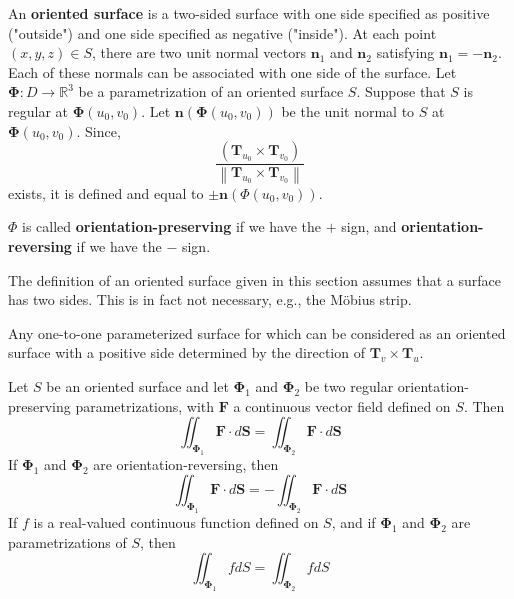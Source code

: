 \noindent An \textbf{oriented surface} is a two-sided surface with one side specified as positive ("outside") and one side specified as negative ("inside"). At each point $(x, y, z) \in S$, there are two unit normal vectors $\mathbf{n}_1$ and $\mathbf{n}_2$ satisfying $\mathbf{n}_1 = -\mathbf{n}_2$. Each of these normals can be associated with one side of the surface. Let $\boldsymbol{\Phi}: D \rightarrow \mathbb{R}^3$ be a parametrization of an oriented surface $S$. Suppose  that $S$ is regular at $\boldsymbol{\Phi}\left(u_0, v_0\right)$. Let $\mathbf{n}\left(\boldsymbol{\Phi}\left(u_0, v_0\right)\right)$ be the unit normal to $S$ at $\mathbf{\Phi}(u_0, v_0)$. Since,
\[\frac{\left(\mathbf{T}_{u_0} \times \mathbf{T}_{v_0}\right) }{\left\|\mathbf{T}_{u_0} \times \mathbf{T}_{v_0}\right\|}\]
\sloppy exists, it is defined and equal to $\pm \mathbf{n}\left(\Phi\left(u_0, v_0\right)\right)$.

\begin{rmk}
	$\Phi$ is called \textbf{orientation-preserving} if we have the $+$ sign, and \textbf{orientation-reversing} if we have the $-$ sign.
\end{rmk}

\begin{marginfigure}
	The definition of an oriented surface given in this section assumes that a surface has two sides. This is in fact not necessary, e.g., the Möbius strip.
\end{marginfigure}

\begin{rmk}
	Any one-to-one parameterized surface for which  can be considered as an oriented surface with a positive side determined by the direction of $\mathbf{T}_v \times \mathbf{T}_u$.
\end{rmk}

\begin{thm}
	Let $S$ be an oriented surface and let $\mathbf{\Phi}_1$ and $\mathbf{\Phi}_2$ be two regular orientation-preserving parametrizations, with $\mathbf{F}$ a continuous vector field defined on $S$. Then
	\[\iint_{\boldsymbol{\Phi}_1} \mathbf{F} \cdot d \mathbf{S}=\iint_{\boldsymbol{\Phi}_2} \mathbf{F} \cdot d \mathbf{S}\]
	If $\boldsymbol{\Phi}_1$ and $\boldsymbol{\Phi}_2$ are orientation-reversing, then
	\[\iint_{\boldsymbol{\Phi}_1} \mathbf{F} \cdot d \mathbf{S}=-\iint_{\boldsymbol{\Phi}_2} \mathbf{F} \cdot d \mathbf{S}\]
	If $f$ is a real-valued continuous function defined on $S$, and if $\boldsymbol{\Phi}_1$ and $\boldsymbol{\Phi}_2$ are parametrizations of $S$, then
	\[\iint_{\mathbf{\Phi}_1} f d S=\iint_{\mathbf{\Phi}_2} f d S\]
\end{thm}

